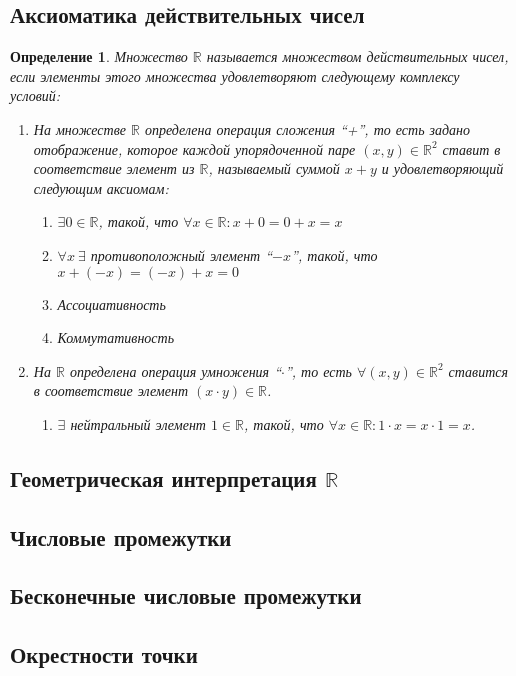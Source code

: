\documentclass[a4paper,12pt]{article} %
\newtheorem{definition}{Определение}
\begin{document}
\subsection{Аксиоматика действительных чисел}
\begin{definition}
	Множество $\mathbb{R}$ называется множеством действительных чисел, если элементы этого множества удовлетворяют следующему комплексу условий:
\begin{enumerate}
	\item На множестве $\mathbb{R}$ определена операция сложения ``+'', то есть задано отображение, которое каждой упорядоченной паре $(x,y)\in \mathbb{R}^2$ ставит в соответствие элемент из $\mathbb{R}$, называемый суммой $x+y$ и удовлетворяющий следующим аксиомам:
		\begin{enumerate}
			\item $\exists 0\in \mathbb{R}$, такой, что $\forall x\in \mathbb{R}:x+0=0+x=x$
			\item $\forall x \ \exists$ противоположный элемент ``$-x$'', такой, что $x+(-x)=(-x)+x=0$
			\item Ассоциативность
			\item Коммутативность
		\end{enumerate}
	\item На $\mathbb{R}$ определена операция умножения ``$\cdot$'', то есть $\forall(x,y)\in\mathbb{R}^2$ ставится в соответствие элемент $(x\cdot y)\in \mathbb{R}$.
		\begin{enumerate}
			\item $\exists $ нейтральный элемент $1\in \mathbb{R}$, такой, что $\forall x\in \mathbb{R}:1\cdot x=x\cdot 1=x$.
		\end{enumerate}
\end{enumerate}
	
\end{definition}

\subsection{Геометрическая интерпретация $\mathbb{R}$}
\subsection{Числовые промежутки}
\subsection{Бесконечные числовые промежутки}
\subsection{Окрестности точки}
\end{document}
